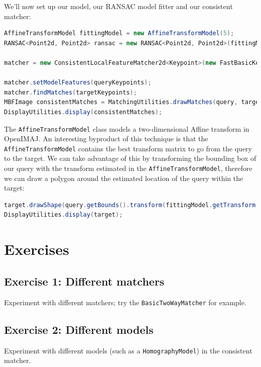 \documentclass[10pt,a4paper,twoside,extrafontsizes]{memoir}
\begin{document}
We'll now set up our model, our RANSAC model fitter and our consistent matcher:
\begin{lstlisting}[language=java]
AffineTransformModel fittingModel = new AffineTransformModel(5);
RANSAC<Point2d, Point2d> ransac = new RANSAC<Point2d, Point2d>(fittingModel, 1500, new RANSAC.PercentageInliersStoppingCondition(0.5), true);

matcher = new ConsistentLocalFeatureMatcher2d<Keypoint>(new FastBasicKeypointMatcher<Keypoint>(8), ransac);

matcher.setModelFeatures(queryKeypoints);
matcher.findMatches(targetKeypoints);
MBFImage consistentMatches = MatchingUtilities.drawMatches(query, target, matcher.getMatches(), RGBColour.RED);
DisplayUtilities.display(consistentMatches);
\end{lstlisting}
The \verb+AffineTransformModel+ class models a two-dimensional Affine transform in OpenIMAJ. An interesting 
byproduct of this technique is that the \verb+AffineTransformModel+ contains the best transform matrix 
to go from the query to the target. We can take advantage of this by transforming the bounding box of 
our query with the transform estimated in the \verb+AffineTransformModel+, therefore we can draw a 
polygon around the estimated location of the query within the target:
\begin{lstlisting}[language=java]
target.drawShape(query.getBounds().transform(fittingModel.getTransform().inverse()), 3,RGBColour.BLUE);
DisplayUtilities.display(target); 
\end{lstlisting}

\section*{Exercises}
\subsection*{Exercise 1: Different matchers}
Experiment with different matchers; try the \verb+BasicTwoWayMatcher+ for example.

\subsection*{Exercise 2: Different models}
Experiment 
with different models (such as a \verb+HomographyModel+) in the consistent matcher. 
\end{document}
